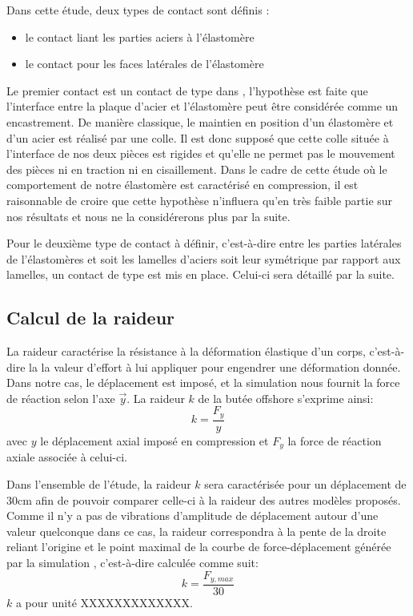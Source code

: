 ﻿\documentclass{article}
\newcommand{\abaqus}{\bsc{Abaqus}\xspace}
\begin{document}
Dans cette étude, deux types de contact sont définis :
\begin{itemize}
\item le contact liant les parties aciers à l'élastomère
\item le contact pour les faces latérales de l'élastomère
\end{itemize}

Le premier contact est un contact de type  dans \abaqus, l'hypothèse est faite que l'interface entre la plaque d'acier et l'élastomère peut être considérée comme un encastrement. De manière classique, le maintien en position d'un élastomère et d'un acier est réalisé par une colle. Il est donc supposé que cette colle située à l'interface de nos deux pièces est rigides et qu'elle ne permet pas le mouvement des pièces ni en traction ni en cisaillement. Dans le cadre de cette étude où le comportement de notre élastomère est caractérisé en compression, il est raisonnable de croire que cette hypothèse n'influera qu'en très faible partie sur nos résultats et nous ne la considérerons plus par la suite.

Pour le deuxième type de contact à définir, c'est-à-dire entre les parties latérales de l'élastomères et soit les lamelles d'aciers soit leur symétrique par rapport aux lamelles, un contact de type  est mis en place. Celui-ci sera détaillé par la suite.

\subsection{Calcul de la raideur}

La raideur caractérise la résistance à la déformation élastique d'un corps, c'est-à-dire la la valeur d'effort à lui appliquer pour engendrer une déformation donnée. Dans notre cas, le déplacement est imposé, et la simulation \abaqus nous fournit la force de réaction selon l'axe $\vec{y}$. La raideur $k$ de la butée offshore s'exprime ainsi:
\begin{displaymath}
		k=\frac{F_{y}}{y}
	\end{displaymath}
avec $y$ le déplacement axial imposé en compression et $F_{y}$ la force de réaction axiale associée à celui-ci. 

Dans l'ensemble de l'étude, la raideur $k$ sera caractérisée pour un déplacement de 30cm afin de pouvoir comparer celle-ci à la raideur des autres modèles proposés. Comme il n'y a pas de vibrations d'amplitude de déplacement autour d'une valeur quelconque dans ce cas, la raideur correspondra à la pente de la droite reliant l'origine et le point maximal de la courbe de force-déplacement générée par la simulation \abaqus, c'est-à-dire calculée comme suit:
\begin{displaymath}
		k=\frac{F_{y,max}}{30}
	\end{displaymath}
$k$ a pour unité XXXXXXXXXXXXX.
\end{document}
